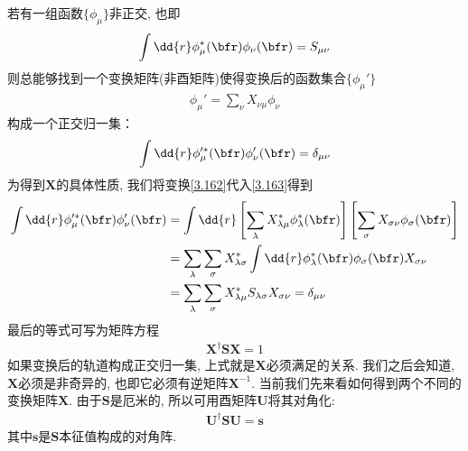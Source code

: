 若有一组函数$\{\phi_\mu\}$非正交, 
也即
\begin{align}
	\int\dd{r}\phi_\mu^*(\bfr)\phi_\nu(\bfr) = S_{\mu\nu}
\end{align}
则总能够找到一个变换矩阵(非酉矩阵)使得变换后的函数集合$\{\phi_\mu'\}$
\begin{align}\label{3.162}
	\phi_\mu' = \sum_{\nu}X_{\nu\mu}\phi_\nu
\end{align}
构成一个正交归一集：
\begin{align}
	\label{3.163}
	\int\dd{r}\phi_\mu^{\prime*}(\bfr)\phi_\nu'(\bfr) = \delta_{\mu\nu}
\end{align}
为得到$\mathbf{X}$的具体性质, 
我们将变换\autoref{3.162}代入\autoref{3.163}得到
\begin{align}
	\int\dd{r}\phi_\mu^{\prime *}(\bfr)\phi_\nu^{\prime}(\bfr) & = \int\dd{r}\left[ \sum_{\lambda}X_{\lambda\mu}^*\phi_{\lambda}^*(\bfr)\right]\left[ \sum_\sigma X_{\sigma\nu}\phi_\sigma(\bfr) \right]\notag\\
	& = \sum_\lambda\sum_\sigma X_{\lambda\sigma}^*\int\dd{r}\phi_\lambda^*(\bfr)\phi_\sigma(\bfr)X_{\sigma\nu}\notag\\
	& = \sum_\lambda\sum_\sigma X_{\lambda\mu}^*S_{\lambda\sigma}X_{\sigma\nu} = \delta_{\mu\nu}
\end{align}
最后的等式可写为矩阵方程
\begin{align}\label{3.165}
	\mathbf{X^\dagger SX}=1
\end{align}
如果变换后的轨道构成正交归一集, 
上式就是$\mathbf{X}$必须满足的关系. 
我们之后会知道, 
$\mathbf{X}$必须是非奇异的, 
也即它必须有逆矩阵$\mathbf{X}^{-1}$. 
当前我们先来看如何得到两个不同的变换矩阵$\mathbf{X}$. 
由于$\mathbf{S}$是厄米的, 
所以可用酉矩阵$\mathbf{U}$将其对角化:
\begin{align}
        \label{3.166}
	\mathbf{U^\dagger SU=s}
\end{align} 
其中$\mathbf{s}$是$\mathbf{S}$本征值构成的对角阵.


